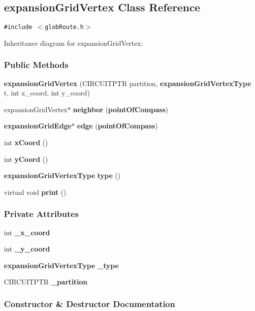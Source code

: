 \subsection{expansion\-Grid\-Vertex  Class Reference}
\label{expansionGridVertex}
{\tt \#include $<$glob\-Route.h$>$}

Inheritance diagram for expansion\-Grid\-Vertex:\begin{figure}[H]
\begin{center}
\leavevmode
\setlength{\epsfysize}{2cm}
\end{center}
\end{figure}
\subsubsection*{Public Methods}
\begin{CompactItemize}
\item 
{\bf expansion\-Grid\-Vertex} (CIRCUITPTR partition, {\bf expansion\-Grid\-Vertex\-Type} t, int x\_\-coord, int y\_\-coord)
\item 
expansion\-Grid\-Vertex$\ast$ {\bf neighbor} ({\bf point\-Of\-Compass})
\item 
{\bf expansion\-Grid\-Edge}$\ast$ {\bf edge} ({\bf point\-Of\-Compass})
\item 
int {\bf x\-Coord} ()
\item 
int {\bf y\-Coord} ()
\item 
{\bf expansion\-Grid\-Vertex\-Type} {\bf type} ()
\item 
virtual void {\bf print} ()
\end{CompactItemize}
\subsubsection*{Private Attributes}
\begin{CompactItemize}
\item 
int {\bf \_\-x\_\-coord}
\item 
int {\bf \_\-y\_\-coord}
\item 
{\bf expansion\-Grid\-Vertex\-Type} {\bf \_\-type}
\item 
CIRCUITPTR {\bf \_\-partition}
\end{CompactItemize}


\subsubsection{Constructor \& Destructor Documentation}
\label{expansionGridVertex_a0}
